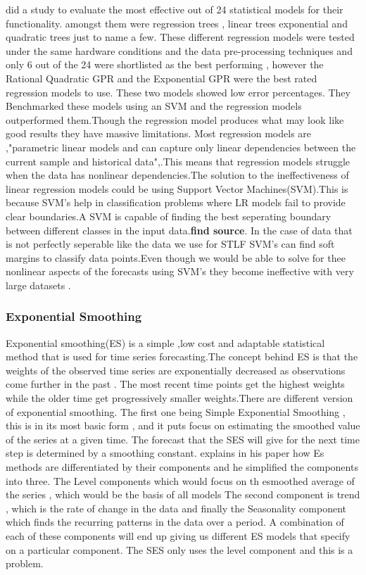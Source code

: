  \cite{gochhait2023regression} did a study to evaluate the most effective out of 24 statistical models for their functionality. amongst them were regression trees , linear trees exponential and quadratic trees just to name a few. These different regression models were tested under the same hardware conditions and the data pre-processing techniques and only 6 out of the 24 were shortlisted as the best performing , however the Rational Quadratic GPR and the Exponential GPR were the best rated regression models to use. These two models showed low error percentages. They Benchmarked these models using an SVM and the regression models outperformed them.Though the regression model produces what may look like good results they have massive limitations. Most regression models are ,"parametric linear models and can capture only linear dependencies between the current sample and historical data",\cite{tshipata2024multi}.This means that regression models struggle when the data has nonlinear dependencies.The solution to the ineffectiveness of linear regression models could be using Support Vector Machines(SVM).This is because SVM's help in classification problems where LR models fail to provide clear boundaries.A SVM is capable of finding the best seperating boundary between different classes in the input data.\textbf{find source}. In the case of data that is not perfectly seperable like the data we use for STLF SVM's can find soft margins to classify data points.Even though we would be able to solve for thee nonlinear aspects of the forecasts using SVM's they become ineffective with very large datasets \cite{vardhan2023comparative}.
 
 
 
 \subsubsection{Exponential Smoothing }
 Exponential smoothing(ES) is a simple  ,low cost and adaptable statistical method that is used for time series forecasting.The concept behind ES is that the  weights of the observed time series are exponentially decreased as observations come further in the past \cite{ramos2015performance}.
 The most recent time points get the highest weights while the older time get progressively smaller weights\cite{ramos2015performance}.There are different version of exponential smoothing. The first one being Simple Exponential Smoothing , this is in its most basic form , and it puts focus on estimating the smoothed value of the series at a given time. The forecast that the SES will give for the next time step is determined by a smoothing constant\cite{ahmed2020review}.\cite{ramos2015performance} explains in his paper how Es methods are differentiated by their components and he simplified the components into three. The Level components which would focus on th esmoothed average of the series  , which would be the basis of all models  The second component is trend , which is the rate of change in the data and finally the Seasonality component which finds the recurring patterns in the data over a period. A combination of each of these components will end up giving us different ES models that specify on a particular component. The SES only uses the level component and this is a problem.
 
